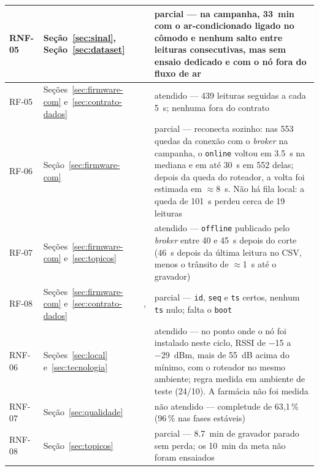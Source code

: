 {\begin{longtable}{@{}L{1.8cm}L{3.6cm}L{2.2cm}L{6.0cm}@{}}
RNF-05 & Seção~\ref{sec:sinal}, Seção~\ref{sec:dataset} &  & parcial --- na campanha, \SI{33}{\minute} com o ar-condicionado ligado no cômodo e nenhum salto entre leituras consecutivas, mas sem ensaio dedicado e com o nó fora do fluxo de ar \\
\midrule
RF-05  & Seções~\ref{sec:firmware-com} e~\ref{sec:contrato-dados} &  & atendido --- 439 leituras seguidas a cada \SI{5}{\second}; nenhuma fora do contrato \\
RF-06  & Seção~\ref{sec:firmware-com}  &  & parcial --- reconecta sozinho: nas 553 quedas da conexão com o \emph{broker} na campanha, o \texttt{online} voltou em \SI{3,5}{\second} na mediana e em até \SI{30}{\second} em 552 delas; depois da queda do roteador, a volta foi estimada em $\approx$\SI{8}{\second}. Não há fila local: a queda de \SI{101}{\second} perdeu cerca de 19 leituras \\
RF-07  & Seções~\ref{sec:firmware-com} e~\ref{sec:topicos} &  & atendido --- \texttt{offline} publicado pelo \emph{broker} entre 40 e \SI{45}{\second} depois do corte (\SI{46}{\second} depois da última leitura no CSV, menos o trânsito de $\approx$\SI{1}{\second} até o gravador) \\
RF-08  & Seções~\ref{sec:firmware-com} e~\ref{sec:contrato-dados} & ,  & parcial --- \texttt{id}, \texttt{seq} e \texttt{ts} certos, nenhum \texttt{ts} nulo; falta o \texttt{boot} \\
RNF-06 & Seções~\ref{sec:local} e~\ref{sec:tecnologia} &  & atendido --- no ponto onde o nó foi instalado neste ciclo, RSSI de \SI{-15}{} a \SI{-29}{dBm}, mais de \SI{55}{\deci\bel} acima do mínimo, com o roteador no mesmo ambiente; regra medida em ambiente de teste (24/10). A farmácia não foi medida \\
RNF-07 & Seção~\ref{sec:qualidade}     &  & não atendido --- completude de 63,1\,\% (96\,\% nas fases estáveis) \\
RNF-08 & Seção~\ref{sec:topicos}       &  & parcial --- \SI{8,7}{\minute} de gravador parado sem perda; os \SI{10}{\minute} da meta não foram ensaiados \\
\end{longtable}
\vspace{-0.6\baselineskip}
}
